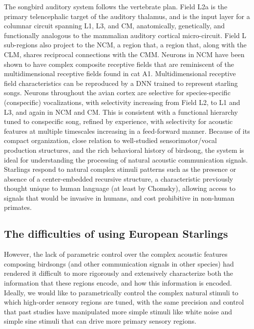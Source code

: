 The songbird auditory system follows the vertebrate plan\cite{Carr1992}. Field L2a is the primary telencephalic target of the auditory thalamus\cite{p05432}, and is the input layer for a columnar circuit spanning L1, L3, and \ac{CM}, anatomically\cite{Wang2010a,p10330}, genetically\cite{Dugas-Ford2012}, and functionally\cite{Calabrese2015} analogous to the mammalian auditory cortical micro-circuit. Field L sub-regions also project to the \ac{NCM}, a region that, a region that, along with the \ac{CLM}, shares reciprocal connections with the \ac{CMM}. Neurons in \ac{NCM} have been shown to have complex composite receptive fields\cite{kozlov2016central} that are reminiscent of the multidimensional receptive fields found in cat A1\cite{atencio2008cooperative}. Multidimensional receptive field characteristics can be reproduced by a \ac{DNN}\cite{kozlov2016central} trained to represent starling songs. Neurons throughout the avian cortex are selective for species-specific (conspecific) vocalizations\cite{Bonke1979,Leppelsack1976,Muller1985}, with selectivity increasing from Field L2, to L1 and L3\cite{Theunissen2004,Theunissen1998,Theunissen2000}, and again in \ac{NCM} and \ac{CM}\cite{Calabrese2015,Muller1985,Grace2003,Bonke1979,Leppelsack1976,p02120,Gentner2004,Thompson2010,Jeanne2011}. This is consistent with a functional hierarchy tuned to conspecific song\cite{Hsu2004,Woolley2005}, refined by experience\cite{p02120,Sockman2002,Sockman2005,Phan2006,Thompson2010,Jeanne2011}, with selectivity for acoustic features at multiple timescales increasing in a feed-forward manner\cite{Rose1988,Kaas2000,Binder2000,VanEssen1992}. Because of its compact organization, close relation to well-studied sensorimotor/vocal production structures, and the rich behavioral history of birdsong, the system is ideal for understanding the processing of natural acoustic communication signals.
Starlings respond to natural complex stimuli patterns such as the presence or absence of a center-embedded recursive structure\cite{gentner2006recursive,comins2014auditory,comins2014temporal}, a characteristic previously thought unique to human language (at least by Chomsky), allowing access to signals that would be invasive in humans, and cost prohibitive in non-human primates.

\subsection{The difficulties of using European Starlings}

However, the lack of parametric control over the complex acoustic features composing birdsongs (and other communication signals in other species) had rendered it difficult to more rigorously and extensively characterize both the information that these regions encode, and how this information is encoded.  Ideally, we would like to parametrically control the complex natural stimuli to which high-order sensory regions are tuned, with the same precision and control that past studies have manipulated more simple stimuli like white noise and simple sine stimuli that can drive more primary sensory regions.

